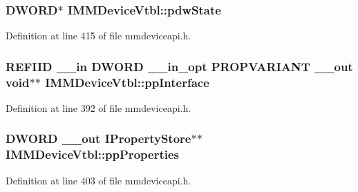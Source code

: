 \subsubsection[{\texorpdfstring{pdw\+State}{pdwState}}]{ {\bf D\+W\+O\+RD}$\ast$ I\+M\+M\+Device\+Vtbl\+::pdw\+State}\hypertarget{struct_i_m_m_device_vtbl_a22a92221eac7cdd449eedea4d47bf2f0}{}\label{struct_i_m_m_device_vtbl_a22a92221eac7cdd449eedea4d47bf2f0}


Definition at line 415 of file mmdeviceapi.\+h.

\subsubsection[{\texorpdfstring{pp\+Interface}{ppInterface}}]{ {\bf R\+E\+F\+I\+ID} {\bf \+\_\+\+\_\+in} {\bf D\+W\+O\+RD} {\bf \+\_\+\+\_\+in\+\_\+opt} {\bf P\+R\+O\+P\+V\+A\+R\+I\+A\+NT} {\bf \+\_\+\+\_\+out} {\bf void}$\ast$$\ast$ I\+M\+M\+Device\+Vtbl\+::pp\+Interface}\hypertarget{struct_i_m_m_device_vtbl_ac016cb0f93ad54c50ddc2d8e81469a15}{}\label{struct_i_m_m_device_vtbl_ac016cb0f93ad54c50ddc2d8e81469a15}


Definition at line 392 of file mmdeviceapi.\+h.

\subsubsection[{\texorpdfstring{pp\+Properties}{ppProperties}}]{ {\bf D\+W\+O\+RD} {\bf \+\_\+\+\_\+out} {\bf I\+Property\+Store}$\ast$$\ast$ I\+M\+M\+Device\+Vtbl\+::pp\+Properties}\hypertarget{struct_i_m_m_device_vtbl_adc3b2fd7126714cbcd83208fe0643b16}{}\label{struct_i_m_m_device_vtbl_adc3b2fd7126714cbcd83208fe0643b16}


Definition at line 403 of file mmdeviceapi.\+h.

